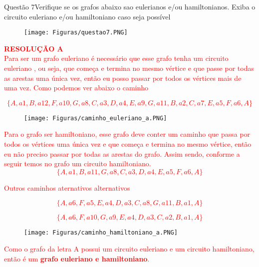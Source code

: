 \documentclass[12pt]{article}
\begin{document}
\begin{section}{Questão 7}{Verifique se os grafos abaixo sao eulerianos e/ou hamiltonianos. Exiba o circuito euleriano e/ou hamiltoniano caso seja possível}

\begin{figure}[H]
    \centering
    \texttt{[image: Figuras/questao7.PNG]}
\end{figure}

\noindent \textbf{\textcolor{red}{RESOLUÇÃO A}}\\

\noindent \textcolor{red}{Para ser um grafo euleriano é necessário que esse grafo tenha um circuito euleriano , ou seja, que começa e termina no mesmo vértice e que passe por todas as arestas uma única vez, então eu posso passar por todos os vértices mais de uma vez. Como podemos ver abaixo o caminho}

\textcolor{red}{$$\{A, a1, B, a12, F, a10, G, a8, C, a3, D, a4, E, a9, G, a11, B, a2, C, a7, E, a5, F, a6, A \}$$}

\begin{figure}[H]
    \centering
    \texttt{[image: Figuras/caminho\_euleriano\_a.PNG]}
\end{figure}

\noindent \textcolor{red}{Para o grafo ser hamiltoniano, esse grafo deve conter um caminho que passa por todos os vértices uma única vez e que começa e termina no mesmo vértice, então eu não preciso passar por todas as arestas do grafo. Assim sendo, conforme a seguir temos no grafo um circuito hamiltoniano.}\\

\textcolor{red}{$$\{A, a1, B, a11, G, a8, C, a3, D, a4, E, a5, F, a6, A \}$$}

\noindent \textcolor{red}{Outros caminhos aternativos alternativos}

\textcolor{red}{$$\{A, a6, F, a5, E, a4, D, a3, C,a8, G, a11, B, a1, A \}$$}

\textcolor{red}{$$\{A, a6, F, a10, G, a9, E, a4, D, a3, C, a2, B, a1, A \}$$}

\begin{figure}[H]
    \centering
    \texttt{[image: Figuras/caminho\_hamiltoniano\_a.PNG]}
\end{figure}

\noindent \textcolor{red}{Como o grafo da letra A possui um circuito euleriano e um circuito hamiltoniano, então é um \textbf{grafo euleriano e hamiltoniano}.}\\


\end{section}
\end{document}
